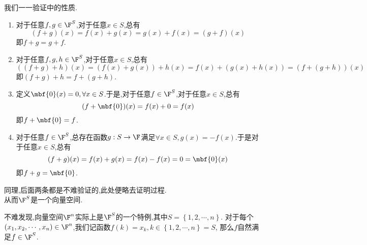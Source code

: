 \documentclass{ctexart}
\begin{document}
\begin{solution}[1.4.1 Proof.]
    我们一一验证中的性质.
    \begin{enumerate}[label=\textbf{(\arabic*)}]
        \item 对于任意$f,g\in\F^S$,对于任意$x\in S$,总有$$(f+g)(x)=f(x)+g(x)=g(x)+f(x)=(g+f)(x)$$即$f+g=g+f$.
        \item 对于任意$f,g,h\in\F^S$,对于任意$x\in S$,总有$$((f+g)+h)(x)=(f(x)+g(x))+h(x)=f(x)+(g(x)+h(x))=(f+(g+h))(x)$$即$(f+g)+h=f+(g+h)$.
        \item 定义$\mbf{0}(x)=0,\forall x\in S$.于是,对于任意$f\in\F^S$,对于任意$x\in S$,总有$$(f+\mbf{0})(x)=f(x)+0=f(x)$$即$f+\mbf{0}=f$.
        \item 对于任意$f\in\F^S$,总存在函数$g:S\to\F$满足$\forall x\in S,g(x)=-f(x)$.于是对于任意$x\in S$,总有$$(f+g)(x)=f(x)+g(x)=f(x)-f(x)=0=\mbf{0}(x)$$即$f+g=\mbf{0}$.
    \end{enumerate}
    同理,后面两条都是不难验证的,此处便略去证明过程.\\
    从而$\F^S$是一个向量空间.
\end{solution}\noindent
不难发现,向量空间$\F^n$实际上是$\F^S$的一个特例,其中$S=\left\{1,2,\cdots,n\right\}$.
对于每个$(x_1,x_2,\cdots,x_n)\in\F^n$,我们记函数$f(k)=x_k,k\in\left\{1,2,\cdots,n\right\}=S$,
那么$f$自然满足$f\in\F^S$.
\end{document}
